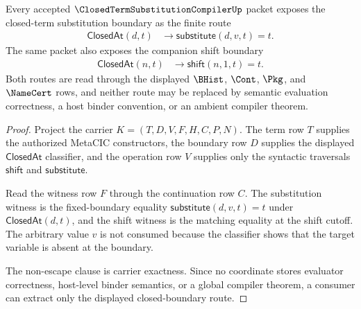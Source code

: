\begin{theorem}
\label{thm:closed-term-substitution-compiler-boundary}
Every accepted $\ClosedTermSubstitutionCompilerUp$ packet exposes the closed-term substitution boundary as the finite route
$$
\begin{aligned}
  \mathsf{ClosedAt}(d,t)
  &\longrightarrow
  \mathsf{substitute}(d,v,t)=t.
\end{aligned}
$$
The same packet also exposes the companion shift boundary
$$
\begin{aligned}
  \mathsf{ClosedAt}(n,t)
  &\longrightarrow
  \mathsf{shift}(n,1,t)=t.
\end{aligned}
$$
Both routes are read through the displayed $\BHist$, $\Cont$, $\Pkg$, and $\NameCert$ rows, and neither route may be replaced by semantic evaluation correctness, a host binder convention, or an ambient compiler theorem.
\end{theorem}
\begin{proof}
Project the carrier $K=(T,D,V,F,H,C,P,N)$. The term row $T$ supplies the authorized MetaCIC constructors, the boundary row $D$ supplies the displayed $\mathsf{ClosedAt}$ classifier, and the operation row $V$ supplies only the syntactic traversals $\mathsf{shift}$ and $\mathsf{substitute}$.

Read the witness row $F$ through the continuation row $C$. The substitution witness is the fixed-boundary equality $\mathsf{substitute}(d,v,t)=t$ under $\mathsf{ClosedAt}(d,t)$, and the shift witness is the matching equality at the shift cutoff. The arbitrary value $v$ is not consumed because the classifier shows that the target variable is absent at the boundary.

The non-escape clause is carrier exactness. Since no coordinate stores evaluator correctness, host-level binder semantics, or a global compiler theorem, a consumer can extract only the displayed closed-boundary route.
\end{proof}

